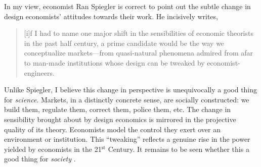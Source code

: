 In my view, economist Ran Spiegler \autocite*{spiegler2024} is correct to point out the subtle change in design economists' attitudes towards their work. He incisively writes, 
\begin{quote}
    [i]f I had to name one major shift in the sensibilities of economic theorists in the past half century, a prime candidate would be the way we conceptualize markets---from quasi-natural phenomena admired from afar to man-made institutions whose design can be tweaked by economist-engineers. \autocite[p137]{spiegler2024}
\end{quote}
\noindent Unlike Spiegler, I believe this change in perspective is unequivocally a good thing for \textit{science}. Markets, in a distinctly concrete sense, are socially constructed: we build them, regulate them, correct them, police them, etc. The change in sensibility brought about by design economics is mirrored in the projective quality of its theory. Economists model the control they exert over an environment or institution. This ``tweaking'' reflects a genuine rise in the power yielded by economists in the 21$^{\text{st}}$ Century. It remains to be seen whether this a good thing for \textit{society} \autocite{hitzigworking}.




